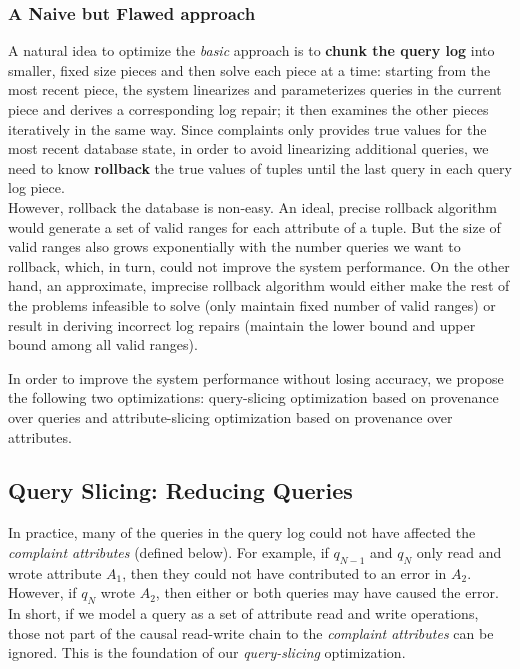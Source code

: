   \subsubsection{A Naive but Flawed approach}
  A natural idea to optimize the \emph{basic} approach is 
  to \textbf{chunk the query log} into
  smaller, fixed size pieces and then solve each piece at a time: starting
  from the most recent piece, the system linearizes and parameterizes queries 
  in the current piece and derives a corresponding log repair; 
  it then examines the other pieces iteratively
  in the same way. Since complaints only provides
  true values for the most recent database state, in order to avoid 
  linearizing additional queries, 
  we need to know \textbf{rollback} the true values of tuples 
  until the last query in each query log piece. \\
  However, rollback the database is non-easy. An ideal, precise rollback
  algorithm would generate a set of valid ranges for each attribute of a tuple. 
  But the size of valid ranges also grows exponentially with the number queries
  we want to rollback, which, in turn, could not improve the system performance. 
  On the other hand, an approximate, imprecise 
  rollback algorithm would either make the rest of the problems
  infeasible to solve (only maintain fixed number of valid ranges) 
  or result in deriving 
  incorrect log repairs (maintain the lower 
  bound and upper bound among all valid ranges).
    

  In order to improve the system performance without losing accuracy, we propose
  the following two optimizations: query-slicing optimization 
  based on provenance over queries and
  attribute-slicing optimization based on provenance over 
  attributes. 
\fi





\subsection{Query Slicing: Reducing Queries}
\label{sec:opt:query}

In practice, many of the queries in the query log could not have affected the \emph{complaint attributes} (defined below). For example, if $q_{N-1}$ and $q_{N}$ 
only read and wrote attribute $A_1$, then they could not have contributed to an error in $A_2$.  
However, if $q_{N}$  wrote $A_2$, then either or both queries may have caused the error. 
In short, if we model a query as a set of attribute read and write operations, those 
not part of the causal read-write chain to the \emph{complaint attributes} can be ignored.
This is the foundation of our \emph{query-slicing} optimization.


